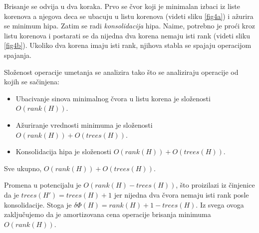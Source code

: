\documentclass[a4paper]{article}
\theoremstyle{plain}
\theoremstyle{definition}
\begin{document}
Brisanje se odvija u dva koraka. Prvo se \v{c}vor koji je minimalan izbaci iz liste korenova a njegova deca se ubacuju u listu korenova (videti sliku \ref{fig4a}) i a\v{z}urira se minimum hipa. Zatim se radi \emph{konsolidacija} hipa. Naime, potrebno je pro\'c{}i kroz listu korenova i postarati se da nijedna dva korena nemaju isti rank (videti sliku \ref{fig4b}). Ukoliko dva korena imaju isti rank, njihova stabla se spajaju operacijom spajanja.

Slo\v{z}enost operacije umetanja se analizira tako \v{s}to se analiziraju operacije od kojih se sa\v{c}injena:
\begin{itemize}
    \item Ubacivanje sinova minimalnog \v{c}vora u listu korena je slo\v{z}enosti $O(rank(H))$.
    \item A\v{z}uriranje vrednosti minimuma je slo\v{z}enosti $O(rank(H)) + O(trees(H))$.
    \item Konsolidacija hipa je slo\v{z}enosti $O(rank(H)) + O(trees(H))$.
\end{itemize}
Sve ukupno, $O(rank(H)) + O(trees(H))$.

Promena u potencijalu je $O(rank(H) - trees(H))$, \v{s}to proizilazi iz \v{c}injenice da je $trees(H') = trees(H) + 1$ jer nijedna dva \v{c}vora nemaju isti rank posle konsolidacije. Stoga je $\delta\Phi(H) = rank(H) + 1 - trees(H)$. Iz svega ovoga zaklju\v{c}ujemo da je amortizovana cena operacije brisanja minimuma $O(rank(H))$.
\end{document}
